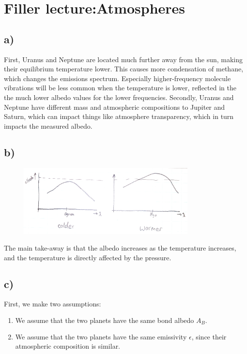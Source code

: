 \section{ Filler lecture:Atmospheres }\label{sec:q4}    


\subsection*{a)}
First, Uranus and Neptune are located much further away from the sun, making their equilibrium temperature lower. This causes more condensation of methane, which changes the emissions spectrum. Especially higher-frequency molecule vibrations will be less common when the temperature is lower, reflected in the the much lower albedo values for the lower frequencies. Secondly, Uranus and Neptune have different mass and atmospheric compositions to Jupiter and Saturn, which can impact things like atmosphere transparency, which in turn impacts the measured albedo.

\subsection*{b)}
\begin{figure}[H]
    \centering
    \includegraphics[width=0.8\textwidth]{figures/4b.jpg}
    \label{fig:my_label4}
\end{figure}
The main take-away is that the albedo increases as the temperature increases, and the temperature is directly affected by the pressure. 

\subsection*{c)}
First, we make two assumptions:
\begin{enumerate}
    \item We assume that the two planets have the same bond albedo $A_B$.
    \item We assume that the two planets have the same emissivity $\epsilon$, since their atmospheric composition is similar.
\end{enumerate}

